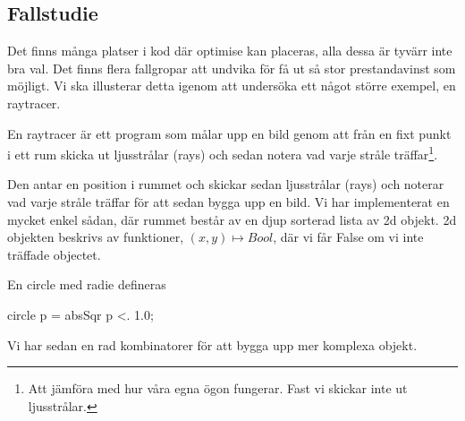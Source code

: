 \documentclass[../Optimise]{subfiles}
\begin{document}
\subsection{Fallstudie}

Det finns många platser i kod där optimise kan placeras, alla dessa är tyvärr inte bra val. Det finns flera fallgropar att undvika för få ut så stor prestandavinst som möjligt. Vi ska illusterar detta igenom att undersöka ett något större exempel, en raytracer.

En raytracer är ett program som målar upp en bild genom att från en fixt punkt i ett rum skicka ut ljusstrålar (rays) och sedan notera vad varje stråle träffar\footnote{Att jämföra med hur våra egna ögon fungerar. Fast vi skickar inte ut ljusstrålar.}.




 Den antar en position i rummet och skickar sedan ljusstrålar (rays) och noterar vad varje stråle träffar för att sedan bygga upp en bild. Vi har implementerat en mycket enkel sådan, där rummet består av en djup sorterad lista av 2d objekt. 2d objekten beskrivs av funktioner, $(x,y) \mapsto Bool$, där vi får False om vi inte träffade objectet.

En circle med radie  defineras
\begin{codeEx}
circle p = absSqr p <. 1.0;
\end{codeEx}

Vi har sedan en rad kombinatorer för att bygga upp mer komplexa objekt.
\end{document}
